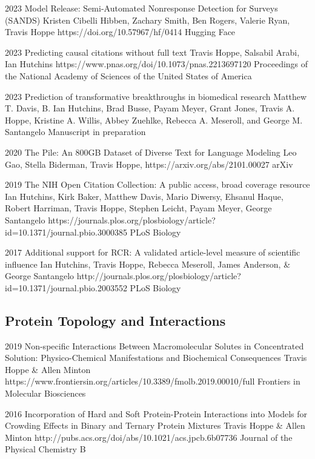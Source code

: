 \documentclass[]{scrartcl}
\begin{document}
\begin{cleanCV}
\Paper
{2023}
{Model Release: Semi-Automated Nonresponse Detection for Surveys (SANDS)}
{Kristen Cibelli Hibben, Zachary Smith, Ben Rogers, Valerie Ryan, Travis Hoppe}
{https://doi.org/10.57967/hf/0414}
{Hugging Face}

\Paper
{2023}
{Predicting causal citations without full text}
{Travis Hoppe, Salsabil Arabi, Ian Hutchins}
{https://www.pnas.org/doi/10.1073/pnas.2213697120}
{Proceedings of the National Academy of Sciences of the United States of America}

\Paper
{2023}
{Prediction of transformative breakthroughs in biomedical research}
{Matthew T. Davis, B. Ian Hutchins, Brad Busse, Payam Meyer, Grant Jones, Travis A. Hoppe, Kristine A. Willis, Abbey Zuehlke, Rebecca A. Meseroll, and George M. Santangelo}
{}{Manuscript in preparation}


\Paper
{2020}
{The Pile: An 800GB Dataset of Diverse Text for Language Modeling}
{Leo Gao, Stella Biderman, Travis Hoppe, \etal}
{https://arxiv.org/abs/2101.00027}
{arXiv}

\Paper
{2019}
{The NIH Open Citation Collection: A public access, broad coverage resource}
{Ian Hutchins, Kirk Baker, Matthew Davis, Mario Diwersy, Ehsanul Haque, Robert Harriman, Travis Hoppe, Stephen Leicht, Payam Meyer, George Santangelo}
{https://journals.plos.org/plosbiology/article?id=10.1371/journal.pbio.3000385}
{PLoS Biology}


\Paper
{2017}
{Additional support for RCR: A validated article-level measure of scientific influence}
{Ian Hutchins, Travis Hoppe, Rebecca Meseroll, James Anderson, \& George Santangelo}
{http://journals.plos.org/plosbiology/article?id=10.1371/journal.pbio.2003552}
{PLoS Biology}


\subsection{Protein Topology and Interactions}

\Paper
{2019}
{Non-specific Interactions Between Macromolecular Solutes in Concentrated Solution: Physico-Chemical Manifestations and Biochemical Consequences}
{Travis Hoppe \& Allen Minton}
{https://www.frontiersin.org/articles/10.3389/fmolb.2019.00010/full}
{Frontiers in Molecular Biosciences}


\Paper
{2016}
{Incorporation of Hard and Soft Protein-Protein Interactions into Models for Crowding Effects in Binary and Ternary Protein Mixtures}
{Travis Hoppe \& Allen Minton}
{http://pubs.acs.org/doi/abs/10.1021/acs.jpcb.6b07736}
{Journal of the Physical Chemistry B}


\end{cleanCV}
\end{document}
